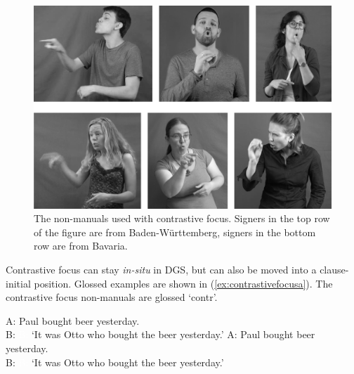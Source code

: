 \begin{figure}[bt]
\centering
	\includegraphics[width=1.0\textwidth]{contrastivefocus2sw.jpg}
	\caption{The non-manuals used with contrastive focus. Signers in the top row of the figure are from Baden-Württemberg, signers in the bottom row are from Bavaria.}
	\label{contrastivefocus}
\end{figure}

Contrastive focus can stay \textit{in-situ} in DGS, but can also be moved into a clause-initial position. Glossed examples are shown in (\ref{ex:contrastivefocusa}). The contrastive focus non-manuals are glossed `contr'.

\begin{exe}
\ex\label{ex:contrastivefocusa}\begin{xlist}
\ex
A: Paul bought beer yesterday. \\
B:   
%
\glt \textcolor{white}{B: }`It was Otto who bought the beer yesterday.' \label{ex:contrastivefocusaa}
\ex
A: Paul bought beer yesterday. \\
B:  
%
\glt \textcolor{white}{B: }`It was Otto who bought the beer yesterday.' \label{ex:contrastivefocusab}


\end{xlist}
\end{exe}

